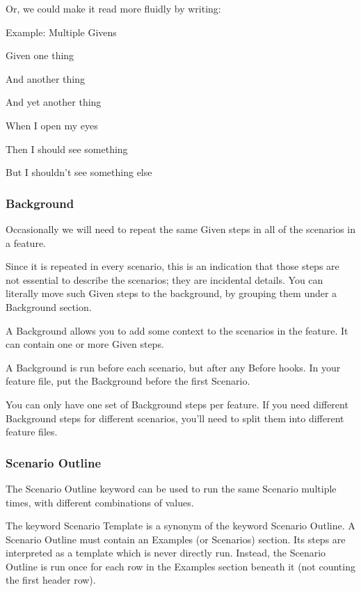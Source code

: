 \documentclass[conference]{IEEEtran}
\begin{document}
Or, we could make it read more fluidly by writing:
\begin{list}{*}{spacing}
	\item Example: Multiple Givens
	\item Given one thing
	\item And another thing
	\item And yet another thing
	\item When I open my eyes
	\item Then I should see something
	\item But I shouldn't see something else
\end{list}

\subsubsection{Background}
Occasionally we will need to repeat the same Given steps in all of the scenarios in a feature.

Since it is repeated in every scenario, this is an indication that those steps are not essential to describe the scenarios; they are incidental details. You can literally move such Given steps to the background, by grouping them under a Background section.

A Background allows you to add some context to the scenarios in the feature. It can contain one or more Given steps.

A Background is run before each scenario, but after any Before hooks. In your feature file, put the Background before the first Scenario.

You can only have one set of Background steps per feature. If you need different Background steps for different scenarios, you’ll need to split them into different feature files.\cite{a1}

\subsubsection{Scenario Outline}
The Scenario Outline keyword can be used to run the same Scenario multiple times, with different combinations of values.

The keyword Scenario Template is a synonym of the keyword Scenario Outline.
A Scenario Outline must contain an Examples (or Scenarios) section. Its steps are interpreted as a template which is never directly run. Instead, the Scenario Outline is run once for each row in the Examples section beneath it (not counting the first header row).\cite{a1}\newline
\end{document}
